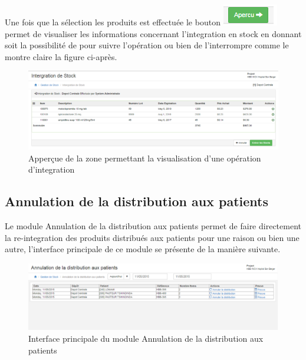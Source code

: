 \documentclass[12pt,a4paper]{report}
\begin{document}
\newpage
Une fois que la sélection les produits est effectuée le bouton \includegraphics[scale=0.7]{pic/ApercIntegration.png} permet de visualiser les informations concernant l'integration en stock en donnant soit la possibilité de pour suivre l'opération ou bien de l'interrompre comme le montre claire la figure ci-après.

\begin{figure}[h]
\begin{center}
\includegraphics[width=12cm]{pic/ValidationIntegration.png}
\end{center}
\caption{Apperçue de la zone permettant la visualisation d'une opération d'integration}
\label{Apperçue de la zone permettant la visualisation d'une opération d'integration}
\end{figure} 

\newpage
\subsection{Annulation de la distribution aux patients}
Le module Annulation de la distribution aux patients permet de faire directement la re-integration des produits distribués aux patients pour une raison ou bien une autre, l'interface principale de ce module se présente de la manière suivante.

\begin{figure}[h]
\begin{center}
\includegraphics[width=14cm]{pic/DistPatient.png}
\end{center}
\caption{Interface principale du module Annulation de la distribution aux patients}
\label{Interface principale du module Annulation de la distribution aux patients}
\end{figure}
\end{document}
